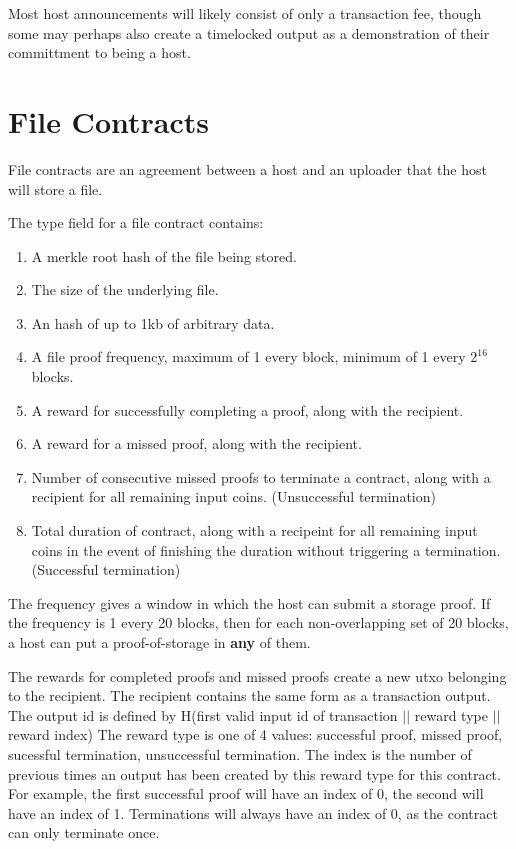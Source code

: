 \documentclass[twocolumn]{article}
\begin{document}
Most host announcements will likely consist of only a transaction fee, though some may perhaps also create a timelocked output as a demonstration of their committment to being a host.

\section{File Contracts}
File contracts are an agreement between a host and an uploader that the host will store a file.

The type field for a file contract contains:
\begin{enumerate}
	\item A merkle root hash of the file being stored.
	\item The size of the underlying file.
	\item An hash of up to 1kb of arbitrary data.
	\item A file proof frequency, maximum of 1 every block, minimum of 1 every $2^{16}$ blocks.
	\item A reward for successfully completing a proof, along with the recipient.
	\item A reward for a missed proof, along with the recipient.
	\item Number of consecutive missed proofs to terminate a contract, along with a recipient for all remaining input coins. (Unsuccessful termination)
	\item Total duration of contract, along with a recipeint for all remaining input coins in the event of finishing the duration without triggering a termination. (Successful termination)
\end{enumerate}

The frequency gives a window in which the host can submit a storage proof.
If the frequency is 1 every 20 blocks, then for each non-overlapping set of 20 blocks, a host can put a proof-of-storage in \textbf{any} of them.

The rewards for completed proofs and missed proofs create a new utxo belonging to the recipient.
The recipient contains the same form as a transaction output.
The output id is defined by H(first valid input id of transaction $||$ reward type $||$ reward index)
The reward type is one of 4 values: successful proof, missed proof, sucessful termination, unsuccessful termination.
The index is the number of previous times an output has been created by this reward type for this contract.
For example, the first successful proof will have an index of 0, the second will have an index of 1.
Terminations will always have an index of 0, as the contract can only terminate once.
\end{document}
